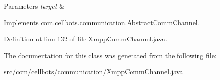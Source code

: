 \begin{DoxyParams}{Parameters}
{\em target} & \\
\hline
\end{DoxyParams}


Implements \hyperlink{classcom_1_1cellbots_1_1communication_1_1_abstract_comm_channel_a8a067cf00a2435c21ea5989af0d94905}{com.\-cellbots.\-communication.\-Abstract\-Comm\-Channel}.



Definition at line 132 of file Xmpp\-Comm\-Channel.\-java.



The documentation for this class was generated from the following file\-:\begin{DoxyCompactItemize}
\item 
src/com/cellbots/communication/\hyperlink{_xmpp_comm_channel_8java}{Xmpp\-Comm\-Channel.\-java}\end{DoxyCompactItemize}
